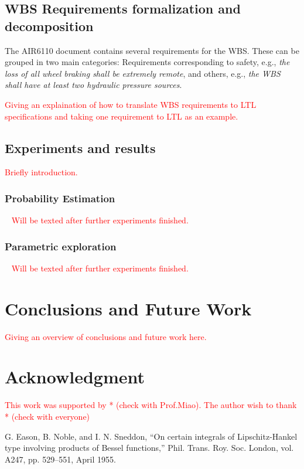 \documentclass[conference]{IEEEtran}
\begin{document}
\subsection{WBS Requirements formalization and decomposition}
The AIR6110 document contains several requirements for the WBS. These can be grouped in two main categories: Requirements corresponding to safety, e.g., \emph{the loss of all wheel braking shall be extremely remote}, and others, e.g., \emph{the WBS shall have at least two hydraulic pressure sources}.

\textcolor{red}{
Giving an explaination of how to translate WBS requirements to LTL specifications and taking one requirement to LTL as an example.
}

\subsection{Experiments and results}
\textcolor{red}{
Briefly introduction.
}

\subsubsection{Probability Estimation}
\ 
\newline 
\textcolor{red}{
\indent Will be texted after further experiments finished.
}

\subsubsection{Parametric exploration}
\ 
\newline 
\textcolor{red}{
	\indent Will be texted after further experiments finished.
}

\section{Conclusions and Future Work}
\textcolor{red}{
	Giving an overview of conclusions and future work here.
}

\section*{Acknowledgment}
\textcolor{red}{
This work was supported by * (check with Prof.Miao). The author wish to thank * (check with everyone)
}

\begin{thebibliography}{00}
 G. Eason, B. Noble, and I. N. Sneddon, ``On certain integrals of Lipschitz-Hankel type involving products of Bessel functions,'' Phil. Trans. Roy. Soc. London, vol. A247, pp. 529--551, April 1955.
\end{thebibliography}
\end{document}
